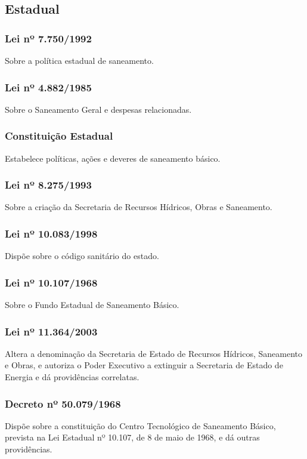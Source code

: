 \subsection{Estadual}
\begin{subapend}
	
	\begin{subsubapend}
		\item \subsubsection{Lei nº 7.750/1992}
		Sobre a política estadual de saneamento.
		\subsubsection{Lei nº 4.882/1985}
		Sobre o Saneamento Geral e despesas relacionadas.
		\subsubsection{Constituição Estadual}
		Estabelece políticas, ações e deveres de saneamento básico.
		\subsubsection{Lei nº 8.275/1993}
		Sobre a criação da Secretaria de Recursos Hídricos, Obras e Saneamento.
		\subsubsection{Lei nº 10.083/1998}
		Dispõe sobre o código sanitário do estado.
		\subsubsection{Lei nº 10.107/1968}
		Sobre o Fundo Estadual de Saneamento Básico.
		\subsubsection{Lei nº 11.364/2003}
		Altera a denominação da Secretaria de Estado de Recursos Hídricos, Saneamento e Obras, e autoriza o Poder Executivo a extinguir a Secretaria de Estado de Energia e dá providências correlatas.
		\subsubsection{Decreto nº 50.079/1968}
		Dispõe sobre a constituição do Centro Tecnológico de Saneamento Básico, prevista na Lei Estadual nº 10.107, de 8 de maio de 1968, e dá outras providências.

\end{subsubapend}
\end{subapend}
